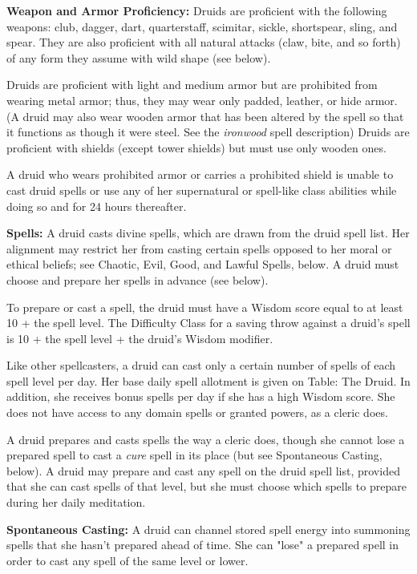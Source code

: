 \classfeatures

\textbf{Weapon and Armor Proficiency:} Druids are proficient with the following weapons: club, dagger, dart, quarterstaff, scimitar, sickle, shortspear, sling, and spear. They are also proficient with all natural attacks (claw, bite, and so forth) of any form they assume with wild shape (see below).

Druids are proficient with light and medium armor but are prohibited from wearing metal armor; thus, they may wear only padded, leather, or hide armor. (A druid may also wear wooden armor that has been altered by the  spell so that it functions as though it were steel. See the \textit{ironwood} spell description) Druids are proficient with shields (except tower shields) but must use only wooden ones.

A druid who wears prohibited armor or carries a prohibited shield is unable to cast druid spells or use any of her supernatural or spell-like class abilities while doing so and for 24 hours thereafter.

\textbf{Spells:} A druid casts divine spells, which are drawn from the druid spell list. Her alignment may restrict her from casting certain spells opposed to her moral or ethical beliefs; see Chaotic, Evil, Good, and Lawful Spells, below. A druid must choose and prepare her spells in advance (see below).

To prepare or cast a spell, the druid must have a Wisdom score equal to at least 10 + the spell level. The Difficulty Class for a saving throw against a druid's spell is 10 + the spell level + the druid's Wisdom modifier.

Like other spellcasters, a druid can cast only a certain number of spells of each spell level per day. Her base daily spell allotment is given on Table: The Druid. In addition, she receives bonus spells per day if she has a high Wisdom score. She does not have access to any domain spells or granted powers, as a cleric does.

A druid prepares and casts spells the way a cleric does, though she cannot lose a prepared spell to cast a \textit{cure} spell in its place (but see Spontaneous Casting, below). A druid may prepare and cast any spell on the druid spell list, provided that she can cast spells of that level, but she must choose which spells to prepare during her daily meditation.

\textbf{Spontaneous Casting:} A druid can channel stored spell energy into summoning spells that she hasn't prepared ahead of time. She can "lose" a prepared spell in order to cast any  spell of the same level or lower.

